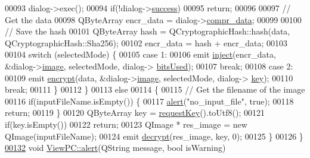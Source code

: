 \begin{DoxyCode}
00093         dialog->exec();
00094         \textcolor{keywordflow}{if}(!dialog->\hyperlink{class_encrypt_dialog_ada4900bcd40894d9c098c65aa4066ac9}{success})
00095             \textcolor{keywordflow}{return};
00096 
00097         \textcolor{comment}{// Get the data}
00098         QByteArray encr\_data = dialog->\hyperlink{class_encrypt_dialog_a3e8998aa39696cbd1242f6420ef18143}{compr\_data};
00099 
00100         \textcolor{comment}{// Save the hash}
00101         QByteArray hash = QCryptographicHash::hash(data, QCryptographicHash::Sha256);
00102         encr\_data = hash + encr\_data;
00103 
00104         \textcolor{keywordflow}{switch} (selectedMode) \{
00105         \textcolor{keywordflow}{case} 1:
00106             emit \hyperlink{class_view_p_c_a652c98014c2df32178d43a5a9612dd99}{inject}(encr\_data, &dialog->\hyperlink{class_encrypt_dialog_a739a0df1d28d06b28a3fd16e2bc16c73}{image}, selectedMode, dialog->
      \hyperlink{class_encrypt_dialog_abf638fea37fbdbaba215954e2e239860}{bitsUsed});
00107             \textcolor{keywordflow}{break};
00108         \textcolor{keywordflow}{case} 2:
00109             emit \hyperlink{class_view_p_c_a9d179ff85ed8b1ca0ff7fa495965b52d}{encrypt}(data, &dialog->\hyperlink{class_encrypt_dialog_a739a0df1d28d06b28a3fd16e2bc16c73}{image}, selectedMode, dialog->
      \hyperlink{class_encrypt_dialog_a1afdef3c665fb0d0fae06d1df8e84951}{key});
00110             \textcolor{keywordflow}{break};
00111         \}
00112     \}
00113     \textcolor{keywordflow}{else}
00114     \{
00115         \textcolor{comment}{// Get the filename of the image}
00116         \textcolor{keywordflow}{if}(inputFileName.isEmpty()) \{
00117             \hyperlink{class_view_p_c_a7c467169467789561078abc9d4fe57bd}{alert}(\textcolor{stringliteral}{"no\_input\_file"}, \textcolor{keyword}{true});
00118             \textcolor{keywordflow}{return};
00119         \}
00120         QByteArray key = \hyperlink{class_view_p_c_a559c95675ec98b15451f3bca47033d9c}{requestKey}().toUtf8();
00121         \textcolor{keywordflow}{if}(key.isEmpty())
00122             \textcolor{keywordflow}{return};
00123         QImage * res\_image = \textcolor{keyword}{new} QImage(inputFileName);
00124         emit \hyperlink{class_view_p_c_a365df051360d557c7221474ad856e0af}{decrypt}(res\_image, key, 0);
00125     \}
00126 \}
\hypertarget{viewpc_8cpp_source.tex_l00132}{}\hyperlink{class_view_p_c_a7c467169467789561078abc9d4fe57bd}{00132} \textcolor{keywordtype}{void} \hyperlink{class_view_p_c_a7c467169467789561078abc9d4fe57bd}{ViewPC::alert}(QString message, \textcolor{keywordtype}{bool} isWarning)

\end{DoxyCode}
